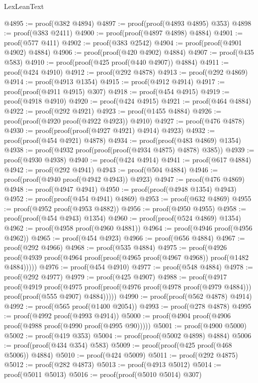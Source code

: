 \begin{lexlean}{LexLeanText}
\begin{coremodule}
@4895 := proof(@382 @4894)
@4897 := proof(proof(@4893 @4895) @353)
@4898 := proof(@383 @2411)
@4900 := proof(proof(@4897 @4898) @4884)
@4901 := proof(@577 @411)
@4902 := proof(@383 @2542)
@4904 := proof(proof(@4901 @4902) @4884)
@4906 := proof(proof(@420 @4902) @4884)
@4907 := proof(@435 @583)
@4910 := proof(proof(@425 proof(@440 @4907)) @4884)
@4911 := proof(@424 @4910)
@4912 := proof(@292 @4878)
@4913 := proof(@292 @4869)
@4914 := proof(@4913 @1354)
@4915 := proof(@4912 @4914)
@4917 := proof(proof(@4911 @4915) @307)
@4918 := proof(@454 @4915)
@4919 := proof(@4918 @4910)
@4920 := proof(@424 @4915)
@4921 := proof(@464 @4884)
@4922 := proof(@292 @4921)
@4923 := proof(@1455 @4884)
@4926 := proof(proof(@4920 proof(@4922 @4923)) @4910)
@4927 := proof(@476 @4878)
@4930 := proof(proof(proof(@4927 @4921) @4914) @4923)
@4932 := proof(proof(@454 @4921) @4878)
@4934 := proof(proof(@483 @4869) @1354)
@4938 := proof(@4932 proof(proof(proof(@4934 @4875) @4878) @385))
@4939 := proof(@4930 @4938)
@4940 := proof(@424 @4914)
@4941 := proof(@617 @4884)
@4942 := proof(@292 @4941)
@4943 := proof(@504 @4884)
@4946 := proof(proof(@4940 proof(@4942 @4943)) @4923)
@4947 := proof(@476 @4869)
@4948 := proof(@4947 @4941)
@4950 := proof(proof(@4948 @1354) @4943)
@4952 := proof(proof(@454 @4941) @4869)
@4953 := proof(@632 @4869)
@4955 := proof(@4952 proof(@4953 @4882))
@4956 := proof(@4950 @4955)
@4958 := proof(proof(@454 @4943) @1354)
@4960 := proof(proof(@524 @4869) @1354)
@4962 := proof(@4958 proof(@4960 @4881))
@4964 := proof(@4946 proof(@4956 @4962))
@4965 := proof(@454 @4923)
@4966 := proof(@656 @4884)
@4967 := proof(@292 @4966)
@4968 := proof(@535 @4884)
@4975 := proof(@4926
      proof(@4939 proof(@4964 proof(proof(@4965 proof(@4967 @4968)) proof(@1482 @4884)))))
@4976 := proof(@454 @4910)
@4977 := proof(@548 @4884)
@4978 := proof(@292 @4977)
@4979 := proof(@425 @4907)
@4988 := proof(@4917
      proof(@4919
          proof(@4975
              proof(proof(@4976 proof(@4978 proof(@4979 @4884))) proof(proof(@555 @4907) @4884)))))
@4990 := proof(proof(@562 @4878) @4914)
@4992 := proof(@565 proof(@1400 @2054))
@4993 := proof(@278 @4878)
@4995 := proof(@4992 proof(@4993 @4914))
@5000 := proof(@4904 proof(@4906 proof(@4988 proof(@4990 proof(@4995 @90)))))
@5001 := proof(@4900 @5000)
@5002 := proof(@419 @353)
@5004 := proof(proof(@5002 @4898) @4884)
@5006 := proof(proof(@434 @354) @583)
@5009 := proof(proof(@425 proof(@468 @5006)) @4884)
@5010 := proof(@424 @5009)
@5011 := proof(@292 @4875)
@5012 := proof(@282 @4873)
@5013 := proof(@4913 @5012)
@5014 := proof(@5011 @5013)
@5016 := proof(proof(@5010 @5014) @307)

\end{coremodule}
\end{lexlean}
